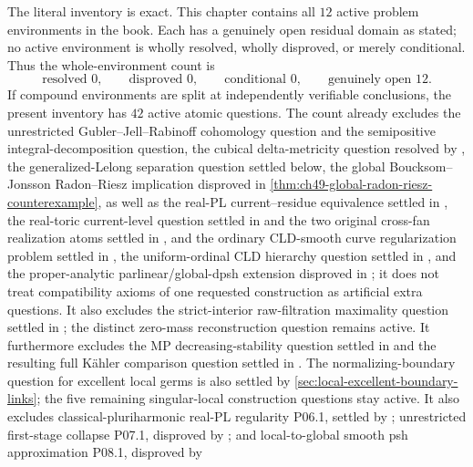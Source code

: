 The literal inventory is exact.  This chapter contains all \(12\) active
problem environments in the book.  Each has a genuinely open residual
domain as stated; no active environment is wholly resolved, wholly
disproved, or merely conditional.  Thus the whole-environment count is
\[
 \text{resolved }0,\qquad
 \text{disproved }0,\qquad
 \text{conditional }0,\qquad
 \text{genuinely open }12.
\]
If compound environments are split at independently verifiable conclusions,
the present inventory has \(42\) active atomic questions.  The count already
excludes the unrestricted Gubler--Jell--Rabinoff cohomology question and the
semipositive integral-decomposition question, the cubical
delta-metricity question resolved by
, the generalized-Lelong
separation question settled below, the global
Boucksom--Jonsson Radon--Riesz implication disproved in
\cref{thm:ch49-global-radon-riesz-counterexample}, as well as the
real-PL current--residue equivalence settled in
, the real-toric
current-level question settled in
 and the two original cross-fan realization
atoms settled in
,
and the ordinary CLD-smooth curve regularization problem settled in
, the uniform-ordinal
CLD hierarchy question settled in
, and the proper-analytic
parlinear/global-dpsh extension disproved in
; it does not treat
compatibility axioms of one requested construction as artificial extra
questions.  It also excludes the strict-interior raw-filtration maximality
question settled in ; the distinct
zero-mass reconstruction question remains active.
It furthermore excludes the MP decreasing-stability question settled in
 and the resulting full K\"ahler
comparison question settled in .
The normalizing-boundary question for excellent local germs is also
settled by \cref{sec:local-excellent-boundary-links}; the five remaining
singular-local construction questions stay active.
It also excludes classical-pluriharmonic real-PL regularity P06.1,
settled by ; unrestricted
first-stage collapse P07.1, disproved by
; and local-to-global smooth
psh approximation P08.1, disproved by
